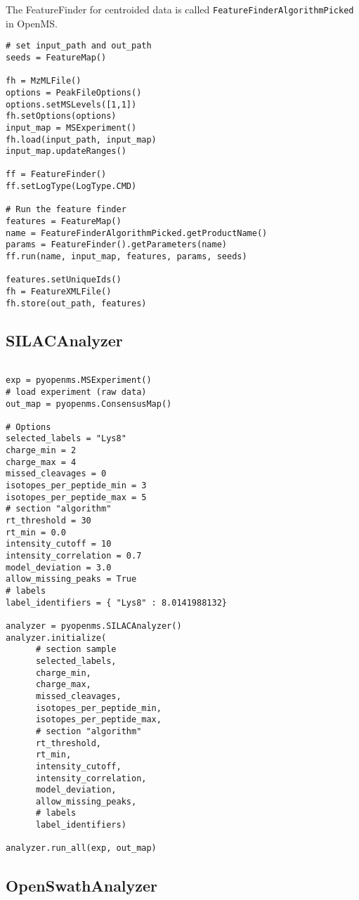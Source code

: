 \documentclass[10pt]{article}
\begin{document}
The FeatureFinder for centroided data is called
\texttt{FeatureFinderAlgorithmPicked} in OpenMS.

\begin{verbatim}
# set input_path and out_path
seeds = FeatureMap()

fh = MzMLFile()
options = PeakFileOptions()
options.setMSLevels([1,1])
fh.setOptions(options)
input_map = MSExperiment()
fh.load(input_path, input_map)
input_map.updateRanges()

ff = FeatureFinder()
ff.setLogType(LogType.CMD)

# Run the feature finder
features = FeatureMap()
name = FeatureFinderAlgorithmPicked.getProductName()
params = FeatureFinder().getParameters(name)
ff.run(name, input_map, features, params, seeds)

features.setUniqueIds()
fh = FeatureXMLFile()
fh.store(out_path, features)
\end{verbatim}

\subsection{SILACAnalyzer}

\begin{verbatim}

exp = pyopenms.MSExperiment()
# load experiment (raw data)
out_map = pyopenms.ConsensusMap()

# Options
selected_labels = "Lys8"
charge_min = 2
charge_max = 4
missed_cleavages = 0
isotopes_per_peptide_min = 3
isotopes_per_peptide_max = 5
# section "algorithm"
rt_threshold = 30
rt_min = 0.0
intensity_cutoff = 10
intensity_correlation = 0.7
model_deviation = 3.0
allow_missing_peaks = True
# labels
label_identifiers = { "Lys8" : 8.0141988132}

analyzer = pyopenms.SILACAnalyzer()
analyzer.initialize(
      # section sample
      selected_labels,
      charge_min,
      charge_max,
      missed_cleavages,
      isotopes_per_peptide_min,
      isotopes_per_peptide_max,
      # section "algorithm"
      rt_threshold,
      rt_min,
      intensity_cutoff,
      intensity_correlation,
      model_deviation,
      allow_missing_peaks,
      # labels
      label_identifiers)

analyzer.run_all(exp, out_map)

\end{verbatim}


\subsection{OpenSwathAnalyzer}
\end{document}
